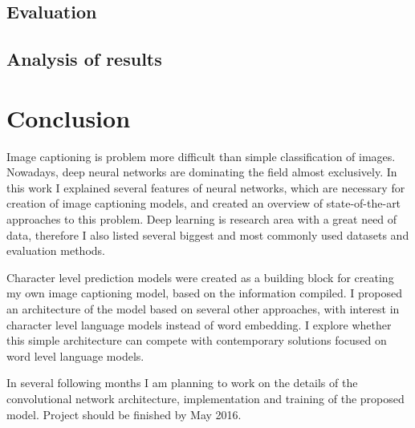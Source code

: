 \section{Evaluation}
\section{Analysis of results}

\chapter{Conclusion}\label{chp:conclusion}


Image captioning is problem more difficult than simple classification of images. Nowadays, deep neural networks are dominating the field almost exclusively. In this work I explained several features of neural networks, which are necessary for creation of image captioning models, and created an overview of state-of-the-art approaches to this problem. Deep learning is research area with a great need of data, therefore I also listed several biggest and most commonly used datasets and evaluation methods.

Character level prediction models were created as a building block for creating my own image captioning model, based on the information compiled. I proposed an architecture of the model based on several other approaches, with interest in character level language models instead of word embedding. I explore whether this simple architecture can compete with contemporary solutions focused on word level language models.

In several following months I am planning to work on the details of the convolutional network architecture, implementation and training of the proposed model. Project should be finished by May 2016.


